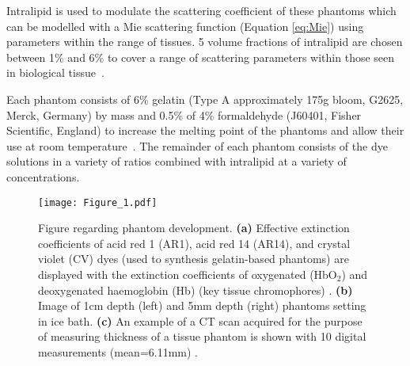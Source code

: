 Intralipid is used to modulate the scattering coefficient of these phantoms which can be modelled with a Mie scattering function (Equation \eqref{eq:Mie}) using parameters within the range of tissues. 5 volume fractions of intralipid are chosen between 1\% and 6\% to cover a range of scattering parameters within those seen in biological tissue~\citep{Jacques2013}. 

Each phantom consists of 6\% gelatin (Type A approximately 175g bloom, G2625, Merck, Germany) by mass %
and 0.5\% of 4\% formaldehyde (J60401, Fisher Scientific, England) to increase the melting point of the phantoms and allow their use at room temperature~\citep{Pogue2006}. The remainder of each phantom consists of the dye solutions in a variety of ratios combined with intralipid at a variety of concentrations. 

\begin{figure}[htb]
    \centering%
    \texttt{[image: Figure\_1.pdf]}
    \caption{Figure regarding phantom development. 
    \textbf{(a)}
    Effective extinction coefficients of acid red 1 (AR1), acid red 14 (AR14), and crystal violet (CV) dyes 
    (used to synthesis gelatin-based phantoms)
    are displayed with the extinction coefficients of oxygenated (HbO$_2$) and deoxygenated haemoglobin (Hb) 
    (key tissue chromophores)
    .
    \textbf{(b)}
    Image of 1cm depth (left) and 5mm depth (right) phantoms setting in ice bath.
    \textbf{(c)}
    An example of a CT scan acquired for the purpose of measuring thickness of a tissue phantom is shown with
    10 digital measurements (mean=6.11mm)%
    .}
    \label{fig:phantommethods}%
\end{figure}

